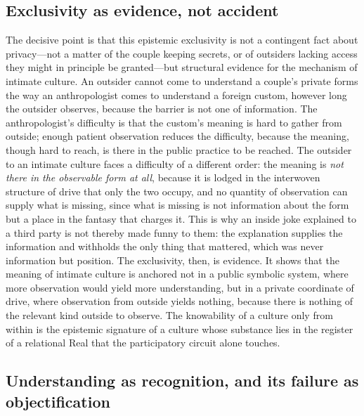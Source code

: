 \subsection*{Exclusivity as evidence, not accident}

The decisive point is that this epistemic exclusivity is not a contingent fact about privacy---not a matter of the couple keeping secrets, or of outsiders lacking access they might in principle be granted---but structural evidence for the mechanism of intimate culture. An outsider cannot come to understand a couple's private forms the way an anthropologist comes to understand a foreign custom, however long the outsider observes, because the barrier is not one of information. The anthropologist's difficulty is that the custom's meaning is hard to gather from outside; enough patient observation reduces the difficulty, because the meaning, though hard to reach, is there in the public practice to be reached. The outsider to an intimate culture faces a difficulty of a different order: the meaning is \emph{not there in the observable form at all}, because it is lodged in the interwoven structure of drive that only the two occupy, and no quantity of observation can supply what is missing, since what is missing is not information about the form but a place in the fantasy that charges it. This is why an inside joke explained to a third party is not thereby made funny to them: the explanation supplies the information and withholds the only thing that mattered, which was never information but position. The exclusivity, then, is evidence. It shows that the meaning of intimate culture is anchored not in a public symbolic system, where more observation would yield more understanding, but in a private coordinate of drive, where observation from outside yields nothing, because there is nothing of the relevant kind outside to observe. The knowability of a culture only from within is the epistemic signature of a culture whose substance lies in the register of a relational Real that the participatory circuit alone touches.

\subsection*{Understanding as recognition, and its failure as objectification}

